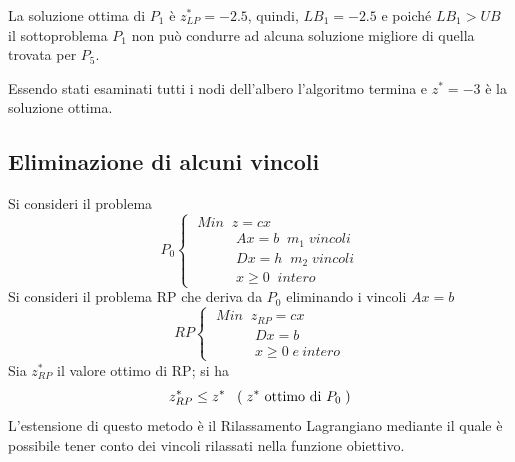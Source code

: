 La soluzione ottima di $P_{1}$ è $z_{LP}^{*}=-2.5$, quindi, $LB_{1}=-2.5$ e poiché $LB_{1}>UB$ il sottoproblema $P_{1}$ non può condurre ad alcuna soluzione migliore di quella trovata per $P_{5}$.

Essendo stati esaminati tutti i nodi dell'albero l'algoritmo termina e $z^{*}=-3$ è la soluzione ottima.

\subsection{Eliminazione di alcuni vincoli}
Si consideri il problema
\begin{displaymath}
P_{0}
\begin{cases}
\;Min\;\;z=cx\\
\;\;\;\;\;\;\;\;\;\;\;A x = b\;\;m_{1}\;vincoli\\
\;\;\;\;\;\;\;\;\;\;\;Dx=h\;\;m_{2}\;vincoli\\
\;\;\;\;\;\;\;\;\;\;\;x\ge 0\;\;intero
\end{cases}
\end{displaymath}
Si consideri il problema RP che deriva da $P_{0}$ eliminando i vincoli $Ax=b$
\begin{displaymath}
RP
\begin{cases}
\;Min\;\;z_{RP}=cx\\
\;\;\;\;\;\;\;\;\;\;\;Dx=b\\
\;\;\;\;\;\;\;\;\;\;\;x \ge 0\;e\:intero
\end{cases}
\end{displaymath}
Sia $z_{RP}^{*}$ il valore ottimo di RP; si ha
\begin{equation}
	z_{RP}^{*}\le z^{*} \;\;\;(\;z^{*}\textnormal{ ottimo di } P_{0}\;)
\end{equation}
L'estensione di questo metodo è il Rilassamento Lagrangiano mediante il quale è possibile tener conto dei vincoli rilassati nella funzione obiettivo.

